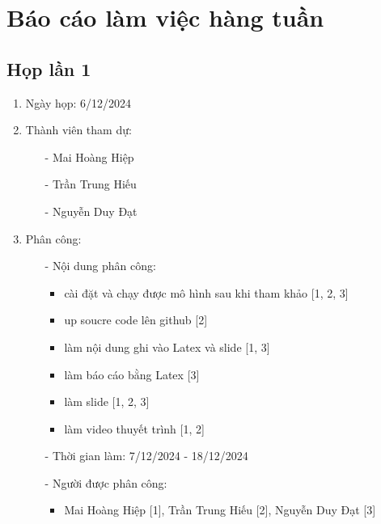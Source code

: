 \chapter{Báo cáo làm việc hàng tuần}
\label{Chapter3}

\begin{enumerate}
    \section{Họp lần 1}
        \begin{enumerate}
            \item Ngày họp: 6/12/2024
            \item Thành viên tham dự:
                \begin{enumerate}
                    \item[-] Mai Hoàng Hiệp
                    \item[-] Trần Trung Hiếu
                    \item[-] Nguyễn Duy Đạt
                \end{enumerate}
            \item Phân công:
                \begin{enumerate}
                    \item[-] Nội dung phân công:
                    \begin{itemize}
                        \item cài đặt và chạy được mô hình sau khi tham khảo [1, 2, 3]
                        \item  up soucre code lên github [2]
                        \item làm nội dung ghi vào Latex và slide [1, 3]
                        \item làm báo cáo bằng Latex [3]
                        \item làm slide [1, 2, 3]
                        \item làm video thuyết trình [1, 2]
                    \end{itemize} 
                    \item[-] Thời gian làm: 7/12/2024 - 18/12/2024
                    \item[-] Người được phân công: 
                    \begin{itemize}
                        \item Mai Hoàng Hiệp [1], Trần Trung Hiếu [2], Nguyễn Duy Đạt [3]
                    \end{itemize}

\end{enumerate}
\end{enumerate}
\end{enumerate}
